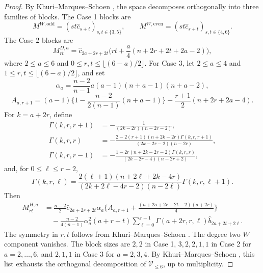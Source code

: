 \documentclass[11pt]{article}
\numberwithin{equation}{section}
\theoremstyle{remark}
\begin{document}
\begin{proof}
By Khuri--Marques--Schoen
\cite[Lemma  A.6 and the proof of Proposition  A.4]{KMS}, the space
decomposes orthogonally into three families of blocks.  The Case  1 blocks are
{
\[
 M^{W,\mathrm{odd}}=(st\widehat c_{s+t})_{s,t\in\{3,5\}},
 \qquad
 M^{W,\mathrm{even}}=(st\widehat c_{s+t})_{s,t\in\{4,6\}}.
\]
}
The Case  2 blocks are
{
\[
 M^{D,a}_{rt}=\widehat c_{2a+2r+2t}
 \bigg(rt+\frac a4(n+2r+2t+2a-2)\bigg),
\]
}
where $2\le a\le6$ and
$0\le r,t\le\lfloor(6-a)/2\rfloor$.
For Case  3, let $2\le a\le4$ and
$1\le r,t\le\lfloor(6-a)/2\rfloor$, and set
 {
\[
 \alpha_a=\frac{n-2}{n-1}a(a-1)(n+a-1)(n+a-2),
\]
}
 {
\[
 A_{a,r+1}
 =(a-1)\bigg\{1-\frac{n-2}{2(n-1)}(n+a-1)\bigg\}
 -\frac{r+1}{2}(n+2r+2a-4).
\]
}
For  $k=a+2r$, define
{
\begin{align*}
 \Gamma(k,r,r+1)
 &=-\frac1{(2k-2r)(n-2r-2)},\\
 \Gamma(k,r,r)
 &=-\frac{2-2(r+1)(n+2k-2r)\Gamma(k,r,r+1)}
 {(2k-2r-2)(n-2r)},\\
 \Gamma(k,r,r-1)
 &=-\frac{1-2r(n+2k-2r-2)\Gamma(k,r,r)}
 {(2k-2r-4)(n-2r+2)},
\end{align*}
}
 and, for $0\le\ell\le r-2$,
{
\[
 \Gamma(k,r,\ell)
 =\frac{2(\ell+1)(n+2\ell+2k-4r)}
 {(2k+2\ell-4r-2)(n-2\ell)}\Gamma(k,r,\ell+1).
\]
}
Then
{
\begin{equation}\label{eq:case-three-appendix}
\begin{aligned}
 M^{H,a}_{rt}
 &=\frac{n-2}{2}\widehat c_{2a+2r+2t}\alpha_a
 \bigg\{A_{a,r+1}
 +\frac{(n+2a+2r+2t-2)(a+2r)}4\bigg\}\\
 &\quad-\frac{n-2}{4(n-1)}\alpha_a^2(a+r+t)
 \sum_{\ell=0}^{r+1}\Gamma(a+2r,r,\ell)
 \widehat b_{2a+2t+2\ell}.
\end{aligned}
\end{equation}
}
The  symmetry in $r,t$ follows from
Khuri--Marques--Schoen \cite[(A.11)]{KMS}.
The degree two $W$ component vanishes.  The block sizes are $2,2$ in
Case  1, $3,2,2,1,1$ in Case  2 for $a=2,\ldots,6$, and $2,1,1$ in
Case  3 for $a=2,3,4$.  By Khuri--Marques--Schoen
\cite[Lemma  A.6]{KMS}, this list exhausts the orthogonal decomposition
of $\mathcal V_{\le6}$, up to multiplicity.


\end{proof}
\end{document}
